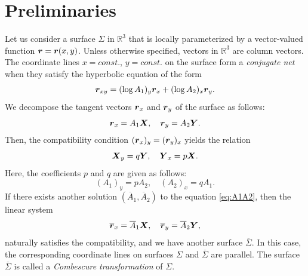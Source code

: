 \documentclass[a4paper]{amsart}
\def\br{\mbox{\boldmath $r$}}
\def\R{\mathbb{R}}
\def\bX{\mbox{\boldmath $X$}}
\def\bY{\mbox{\boldmath $Y$}}
\theoremstyle{definition}
\begin{document}
\section{Preliminaries}
\label{sec:Preliminaries}

Let us consider a surface $\Sigma$ in $\R^3$ that is locally parameterized by a vector-valued function $\br = \br(x, y)$.
Unless otherwise specified, vectors in $\R^3$ are column vectors.
The coordinate lines $x=const.$, $y = const.$ on the surface form a \textit{conjugate net} when they satisfy the hyperbolic equation of the form
\begin{equation}
\br_{xy} = (\log A_1)_y \br_x + (\log A_2)_x \br_y.
\end{equation}
We decompose the tangent vectors $\br_x$ and $\br_y$ of the surface as follows:
\begin{equation}
\br_x = A_1 \bX, \quad
\br_y = A_2 \bY.
\end{equation}
Then, the compatibility condition $(\br_x)_y = (\br_y)_x$ yields the relation
\begin{equation}
\bX_y = q \bY, \quad
\bY_x = p \bX.
\end{equation}
Here, the coefficients $p$ and $q$ are given as follows:
\begin{equation}
\label{eq:A1A2}
(A_1)_y = p A_2, \quad
(A_2)_x = q A_1.
\end{equation}
If there exists another solution $(\overline{A}_1, \overline{A}_2)$ to the equation \eqref{eq:A1A2}, then the linear system
\begin{equation}
\overline{\br}_x = \overline{A}_1 \bX, \quad
\overline{\br}_y = \overline{A}_2 \bY,
\end{equation}
naturally satisfies the compatibility, and we have another surface $\overline{\Sigma}$.
In this case, the corresponding coordinate lines on surfaces $\Sigma$ and $\overline{\Sigma}$ are parallel.
The surface $\overline{\Sigma}$ is called a \textit{Combescure transformation} of $\Sigma$.
\end{document}
